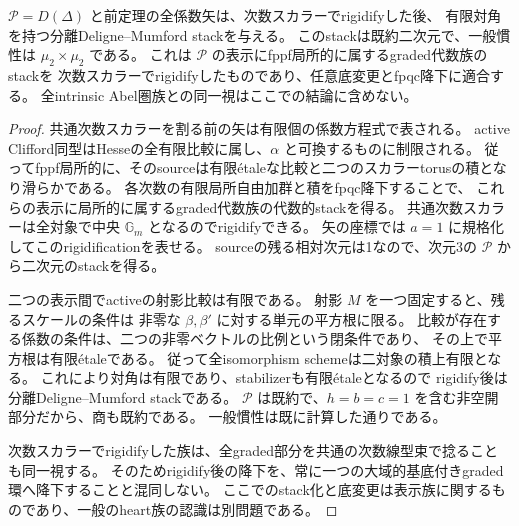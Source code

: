 \begin{corollary}[表示族の代数的stackと次数スカラーrigidification]
\label{cor:normal-order2-presentation-stack}
$\mathcal P=D(\Delta)$ と前定理の全係数矢は、次数スカラーでrigidifyした後、
有限対角を持つ分離Deligne--Mumford stackを与える。
このstackは既約二次元で、一般慣性は $\mu_2\times\mu_2$ である。
これは $\mathcal P$ の表示にfppf局所的に属するgraded代数族のstackを
次数スカラーでrigidifyしたものであり、任意底変更とfpqc降下に適合する。
全intrinsic Abel圏族との同一視はここでの結論に含めない。
\end{corollary}
\begin{proof}
共通次数スカラーを割る前の矢は有限個の係数方程式で表される。
active Clifford同型はHesseの全有限比較に属し、$\alpha$ と可換するものに制限される。
従ってfppf局所的に、そのsourceは有限\'{e}taleな比較と二つのスカラーtorusの積となり滑らかである。
各次数の有限局所自由加群と積をfpqc降下することで、
これらの表示に局所的に属するgraded代数族の代数的stackを得る。
共通次数スカラーは全対象で中央 $\mathbb G_m$ となるのでrigidifyできる。
矢の座標では $a=1$ に規格化してこのrigidificationを表せる。
sourceの残る相対次元は1なので、次元3の $\mathcal P$ から二次元のstackを得る。

二つの表示間でactiveの射影比較は有限である。
射影 $M$ を一つ固定すると、残るスケールの条件は
非零な $\beta,\beta'$ に対する単元の平方根に限る。
比較が存在する係数の条件は、二つの非零ベクトルの比例という閉条件であり、
その上で平方根は有限\'{e}taleである。
従って全isomorphism schemeは二対象の積上有限となる。
これにより対角は有限であり、stabilizerも有限\'{e}taleとなるので
rigidify後は分離Deligne--Mumford stackである。
$\mathcal P$ は既約で、$h=b=c=1$ を含む非空開部分だから、商も既約である。
一般慣性は既に計算した通りである。

次数スカラーでrigidifyした族は、全graded部分を共通の次数線型束で捻ることも同一視する。
そのためrigidify後の降下を、常に一つの大域的基底付きgraded環へ降下することと混同しない。
ここでのstack化と底変更は表示族に関するものであり、一般のheart族の認識は別問題である。
\end{proof}
